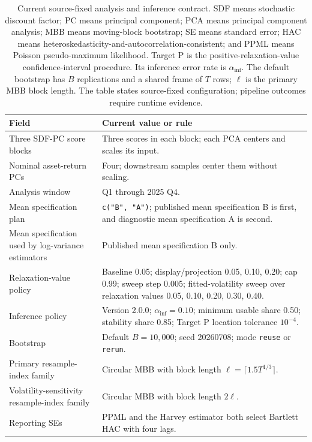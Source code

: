 \documentclass[11pt]{article}
\DeclareRobustCommand{\code}[1]{%
  \ifmmode\text{\ttfamily\detokenize{#1}}\else\nolinkurl{#1}\fi}
\newcommand{\TauP}{\textnormal{Target P}}
\begin{document}
\begin{table}[htbp]
\centering
\small
\caption{Current source-fixed analysis and inference contract. SDF means
stochastic discount factor; PC means principal component; PCA means principal
component analysis; MBB means moving-block bootstrap; SE means standard error;
HAC means heteroskedasticity-and-autocorrelation-consistent; and PPML means
Poisson pseudo-maximum likelihood. Target P is the positive-relaxation-value
confidence-interval procedure. Its inference error rate is
$\alpha_{\mathrm{inf}}$. The default bootstrap has $B$ replications and a
shared frame of $T$ rows; $\ell$ is the primary MBB block length. The table
states source-fixed configuration; pipeline outcomes require runtime evidence.
\label{tab:contract}}
\begin{tabular}{@{}>{\raggedright\arraybackslash}p{}
  >{\raggedright\arraybackslash}p{}@{}}
\toprule
Field & Current value or rule\\
\midrule
Three SDF-PC score blocks & Three scores
in each block; each PCA centers and scales its input.\\
Nominal asset-return PCs & Four; downstream samples center them without scaling.\\
Analysis window & 1962 Q1 through 2025 Q4.\\
Mean specification plan & \code{c("B", "A")}; published mean specification B
is first, and diagnostic mean specification A is second.\\
Mean specification used by log-variance estimators & Published mean
specification B only.\\
Relaxation-value policy & Baseline 0.05; display/projection 0.05, 0.10, 0.20; cap 0.99; sweep
step 0.005; fitted-volatility sweep over relaxation values 0.05, 0.10, 0.20,
0.30, 0.40.\\
Inference policy & Version 2.0.0; $\alpha_{\mathrm{inf}}=0.10$; minimum usable share 0.50;
stability share 0.85; \TauP{} location tolerance $10^{-4}$.\\
Bootstrap & Default $B=10{,}000$; seed 20260708; mode \code{reuse} or \code{rerun}.\\
Primary resample-index family & Circular MBB with block length
$\ell=\lceil1.5T^{1/3}\rceil$.\\
Volatility-sensitivity resample-index family & Circular MBB with block length
$2\ell$.\\
Reporting SEs & PPML and the Harvey estimator both select Bartlett HAC with four lags.\\
\bottomrule
\end{tabular}
\end{table}
\end{document}
